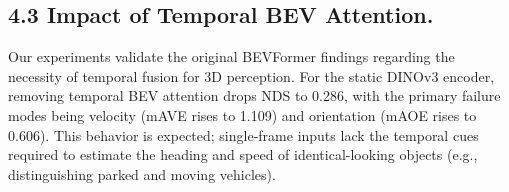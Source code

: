 \documentclass[12pt]{article}
\begin{document}
 





\subsection{4.3 Impact of Temporal BEV Attention.}
Our experiments validate the original BEVFormer findings regarding the necessity of temporal fusion for 3D perception. For the static DINOv3 encoder, removing temporal BEV attention drops NDS to 0.286, with the primary failure modes being velocity (mAVE rises to 1.109) and orientation (mAOE rises to 0.606). This behavior is expected; single-frame inputs lack the temporal cues required to estimate the heading and speed of identical-looking objects (e.g., distinguishing parked and moving vehicles). 
\end{document}
